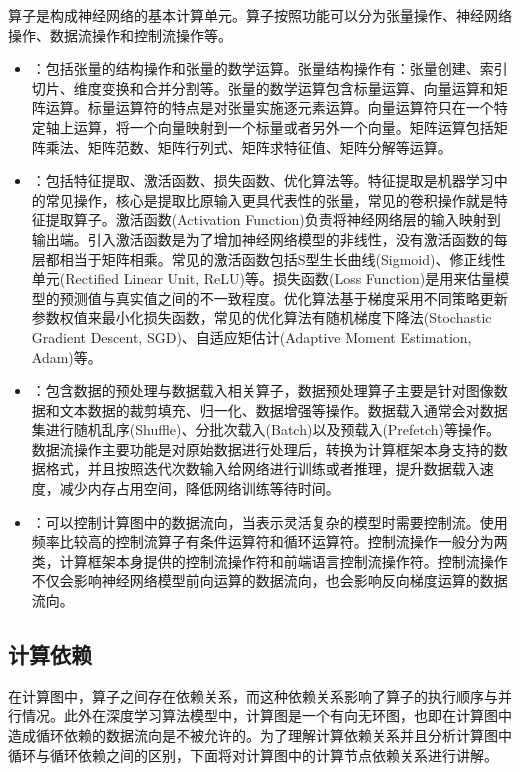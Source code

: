 \documentclass[letterpaper,10pt,english]{sphinxmanual}
\begin{document}
\sphinxAtStartPar
算子是构成神经网络的基本计算单元。算子按照功能可以分为张量操作、神经网络操作、数据流操作和控制流操作等。
\begin{itemize}
\item {} 
\sphinxAtStartPar
{}：包括张量的结构操作和张量的数学运算。张量结构操作有：张量创建、索引切片、维度变换和合并分割等。张量的数学运算包含标量运算、向量运算和矩阵运算。标量运算符的特点是对张量实施逐元素运算。向量运算符只在一个特定轴上运算，将一个向量映射到一个标量或者另外一个向量。矩阵运算包括矩阵乘法、矩阵范数、矩阵行列式、矩阵求特征值、矩阵分解等运算。

\item {} 
\sphinxAtStartPar
{}：包括特征提取、激活函数、损失函数、优化算法等。特征提取是机器学习中的常见操作，核心是提取比原输入更具代表性的张量，常见的卷积操作就是特征提取算子。激活函数(Activation
Function)负责将神经网络层的输入映射到输出端。引入激活函数是为了增加神经网络模型的非线性，没有激活函数的每层都相当于矩阵相乘。常见的激活函数包括S型生长曲线(Sigmoid)、修正线性单元(Rectified
Linear Unit, ReLU)等。损失函数(Loss
Function)是用来估量模型的预测值与真实值之间的不一致程度。优化算法基于梯度采用不同策略更新参数权值来最小化损失函数，常见的优化算法有随机梯度下降法(Stochastic
Gradient Descent, SGD)、自适应矩估计(Adaptive Moment Estimation,
Adam)等。

\item {} 
\sphinxAtStartPar
{}：包含数据的预处理与数据载入相关算子，数据预处理算子主要是针对图像数据和文本数据的裁剪填充、归一化、数据增强等操作。数据载入通常会对数据集进行随机乱序(Shuffle)、分批次载入(Batch)以及预载入(Prefetch)等操作。数据流操作主要功能是对原始数据进行处理后，转换为计算框架本身支持的数据格式，并且按照迭代次数输入给网络进行训练或者推理，提升数据载入速度，减少内存占用空间，降低网络训练等待时间。

\item {} 
\sphinxAtStartPar
{}：可以控制计算图中的数据流向，当表示灵活复杂的模型时需要控制流。使用频率比较高的控制流算子有条件运算符和循环运算符。控制流操作一般分为两类，计算框架本身提供的控制流操作符和前端语言控制流操作符。控制流操作不仅会影响神经网络模型前向运算的数据流向，也会影响反向梯度运算的数据流向。

\end{itemize}


\subsection{计算依赖}
\label{\detokenize{chapter_computational_graph/components_of_computational_graph:id3}}
\sphinxAtStartPar
在计算图中，算子之间存在依赖关系，而这种依赖关系影响了算子的执行顺序与并行情况。此外在深度学习算法模型中，计算图是一个有向无环图，也即在计算图中造成循环依赖的数据流向是不被允许的。为了理解计算依赖关系并且分析计算图中循环与循环依赖之间的区别，下面将对计算图中的计算节点依赖关系进行讲解。
\end{document}
